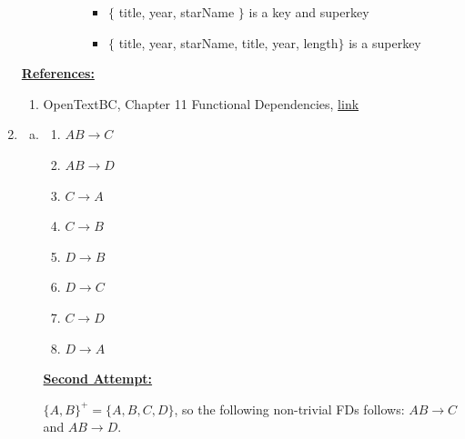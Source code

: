 \documentclass[12pt]{article}
\begin{document}
\begin{enumerate}[1.]
\begin{itemize}
\begin{itemize}
\begin{itemize}
                \begin{itemize}
                    \item $\{$ title, year, starName $\}$ is a key and superkey
                    \item $\{$ title, year, starName, title, year, length$\}$ is a superkey
                \end{itemize}
            \end{itemize}
        \end{itemize}
    \end{itemize}

    \bigskip

    \underline{\textbf{References:}}

    \bigskip

    \begin{enumerate}[1)]
        \item OpenTextBC, Chapter 11 Functional Dependencies, \href{https://opentextbc.ca/dbdesign01/chapter/chapter-11-functional-dependencies/#:~:text=A%20functional%20dependency%20(FD)%20is,determines%20the%20value%20of%20Y.}{link}
    \end{enumerate}

    \item

    \begin{enumerate}[a)]

        \item

        \begin{enumerate}[1.]
            \item $AB \to C$
            \item $AB \to D$
            \item $C \to A$
            \item $C \to B$
            \item $D \to B$
            \item $D \to C$
            \item $C \to D$
            \item $D \to A$
        \end{enumerate}

        \bigskip

        \begin{mdframed}
            \underline{\textbf{Second Attempt:}}

        $\{A,B\}^+ = \{A,B,C,D\}$, so the following non-trivial FDs follows:
        $AB \to C$ and $AB \to D$.


\end{mdframed}
\end{enumerate}
\end{enumerate}
\end{document}
